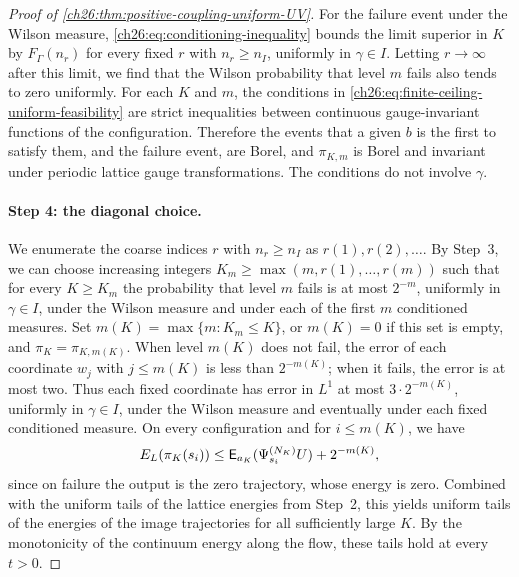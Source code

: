 \begin{proof}[Proof of \cref{ch26:thm:positive-coupling-uniform-UV}]
For the failure event under the Wilson measure, \eqref{ch26:eq:conditioning-inequality} bounds the limit superior in $K$ by $F_\Gamma(n_r)$ for every fixed $r$ with $n_r\ge n_I$, uniformly in $\gamma\in I$. Letting $r\to\infty$ after this limit, we find that the Wilson probability that level $m$ fails also tends to zero uniformly. For each $K$ and $m$, the conditions in \eqref{ch26:eq:finite-ceiling-uniform-feasibility} are strict inequalities between continuous gauge-invariant functions of the configuration. Therefore the events that a given $b$ is the first to satisfy them, and the failure event, are Borel, and $\pi_{K,m}$ is Borel and invariant under periodic lattice gauge transformations. The conditions do not involve $\gamma$.

\paragraph{Step 4: the diagonal choice.}
We enumerate the coarse indices $r$ with $n_r\ge n_I$ as $r(1),r(2),\dots$. By Step~3, we can choose increasing integers $K_m\ge\max(m,r(1),\dots,r(m))$ such that for every $K\ge K_m$ the probability that level $m$ fails is at most $2^{-m}$, uniformly in $\gamma\in I$, under the Wilson measure and under each of the first $m$ conditioned measures. Set $m(K)=\max\{m:K_m\le K\}$, or $m(K)=0$ if this set is empty, and $\pi_K=\pi_{K,m(K)}$. When level $m(K)$ does not fail, the error of each coordinate $w_j$ with $j\le m(K)$ is less than $2^{-m(K)}$; when it fails, the error is at most two. Thus each fixed coordinate has error in $L^1$ at most $3\cdot2^{-m(K)}$, uniformly in $\gamma\in I$, under the Wilson measure and eventually under each fixed conditioned measure. On every configuration and for $i\le m(K)$, we have
\begin{equation}\label{ch26:eq:finite-ceiling-matching-energy}
 E_L(\pi_K(s_i))\le\mathsf E_{a_K}(\Psi^{(N_K)}_{s_i}U)+2^{-m(K)},
\end{equation}
since on failure the output is the zero trajectory, whose energy is zero. Combined with the uniform tails of the lattice energies from Step~2, this yields uniform tails of the energies of the image trajectories for all sufficiently large $K$. By the monotonicity of the continuum energy along the flow, these tails hold at every $t>0$.


\end{proof}
